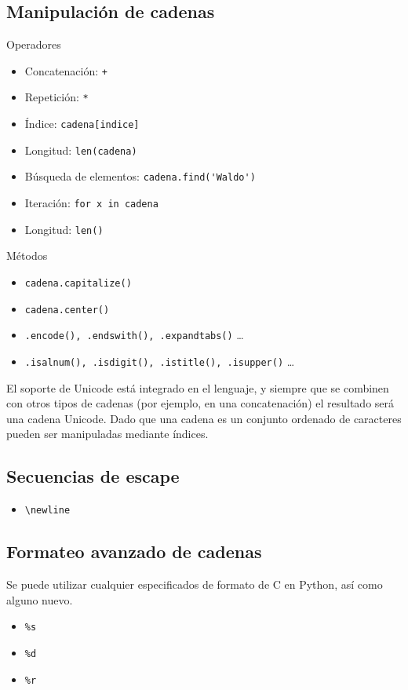 \documentclass[12pt]{article} %
\begin{document}
\subsection{Manipulación de cadenas}
\Large Operadores
\begin{itemize}
	\item Concatenación: \verb|+|
	\item Repetición: \verb+*+
	\item Índice: \verb+cadena[indice]+
	\item Longitud: \verb+len(cadena)+
	\item Búsqueda de elementos: \verb+cadena.find('Waldo')+
	\item Iteración: \verb+for x in cadena+
	\item Longitud: \verb+len()+
\end{itemize}

\Large Métodos
\begin{itemize}
	\item \verb+cadena.capitalize()+
	\item \verb+cadena.center()+
	\item \verb+.encode(), .endswith(), .expandtabs()+ \dots
	\item \verb+.isalnum(), .isdigit(), .istitle(), .isupper()+ \dots
\end{itemize}


El soporte de Unicode está integrado en el lenguaje, y siempre que se combinen con otros tipos de cadenas (por ejemplo, en una concatenación) el resultado será una cadena Unicode.
Dado que una cadena es un conjunto ordenado de caracteres pueden ser manipuladas mediante índices.

\subsection{Secuencias de escape}
\begin{itemize}
	\item \verb+\newline+
\end{itemize}

\subsection{Formateo avanzado de cadenas}
Se puede utilizar cualquier especificados de formato de C en Python, así como alguno nuevo.
\begin{itemize}
	\item \verb+%s+
	\item \verb+%d+
	\item \verb+%r+
\end{itemize}
\end{document}
